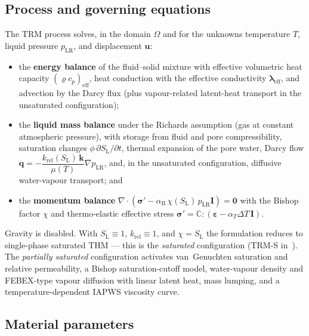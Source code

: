 \documentclass[11pt,a4paper]{tubaf-report}
\newcommand{\vect}[1]{\bm{#1}}
\newcommand{\ten}[1]{\bm{#1}}
\begin{document}
\subsection{Process and governing equations}

The TRM process solves, in the domain $\Omega$ and for the unknowns
temperature $T$, liquid pressure $p_{\mathrm{LR}}$, and displacement
$\vect u$:
\begin{itemize}[nosep]
  \item the \textbf{energy balance} of the fluid--solid mixture with
        effective volumetric heat capacity
        $(\varrho c_p)_{\mathrm{eff}}$, heat conduction with the effective
        conductivity $\ten{\lambda}_{\mathrm{eff}}$, and advection by the
        Darcy flux (plus vapour-related latent-heat transport in the
        unsaturated configuration);
  \item the \textbf{liquid mass balance} under the Richards assumption (gas
        at constant atmospheric pressure), with storage from fluid and pore
        compressibility, saturation changes
        $\phi\,\partial S_{\mathrm L}/\partial t$, thermal expansion of the
        pore water, Darcy flow
        $ \vect q = -\dfrac{k_{\mathrm{rel}}(S_{\mathrm L})\,\ten k}{\mu(T)}
          \nabla p_{\mathrm{LR}}$,
        and, in the unsaturated configuration, diffusive water-vapour
        transport; and
  \item the \textbf{momentum balance}
        $\nabla\cdot\left(\ten\sigma' - \alpha_{\mathrm B}\,
        \chi(S_{\mathrm L})\,p_{\mathrm{LR}}\ten I\right)=\vect 0$ with the
        Bishop factor $\chi$ and thermo-elastic effective stress
        $\ten\sigma'=\mathbb{C}:\left(\ten\varepsilon
        -\alpha_{T}\Delta T\,\ten I\right)$.
\end{itemize}
Gravity is disabled. With $S_{\mathrm L}\equiv1$, $k_{\mathrm{rel}}\equiv1$,
and $\chi=S_{\mathrm L}$ the formulation reduces to single-phase saturated
THM --- this is the \emph{saturated} configuration (TRM-S
in~\cite{pitz2023}). The \emph{partially saturated} configuration activates
van~Genuchten saturation and relative permeability, a Bishop
saturation-cutoff model, water-vapour density and FEBEX-type vapour
diffusion with linear latent heat, mass lumping, and a temperature-dependent
IAPWS viscosity curve.

\subsection{Material parameters}
\end{document}
